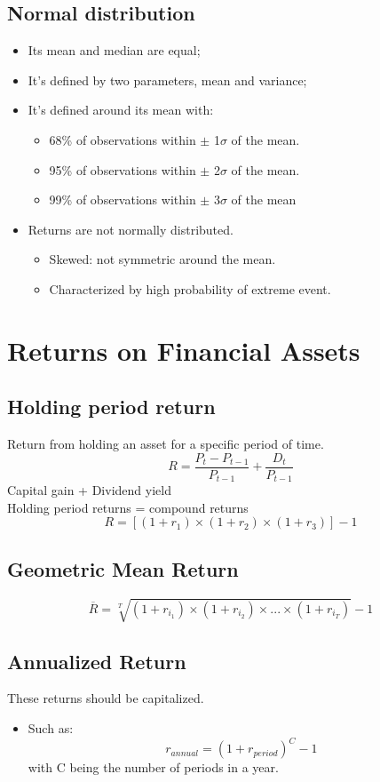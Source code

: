\documentclass[11pt,a4paper]{report}
\begin{document}
\subsection{Normal distribution}
\begin{itemize}
    \item Its mean and median are equal;
    \item It's defined by two parameters, mean and variance;
    \item It's defined around its mean with:
    \begin{itemize}
        \item 68\% of observations within $\pm$ 1$\sigma$ of the mean.
        \item 95\% of observations within $\pm$ 2$\sigma$ of the mean.
        \item 99\% of observations within $\pm$ 3$\sigma$ of the mean
    \end{itemize}
    \item Returns are not normally distributed.
    \begin{itemize}
        \item Skewed: not symmetric around the mean.
        \item Characterized by high probability of extreme event.
    \end{itemize}
\end{itemize}

\section{Returns on Financial Assets}
\subsection{Holding period return} Return from holding an asset for a specific period of time.
\[R = \frac{P_t - P_{t-1}}{P_{t-1}} + \frac{D_t}{P_{t-1}}\]
Capital gain + Dividend yield \\
Holding period returns = compound returns
\[R = [(1 + r_1) \times (1 + r_2) \times (1+r_3)] - 1 \]

\subsection{Geometric Mean Return}
\[\overline{R} = \sqrt[T]{(1+r_{i_1}) \times (1+r_{i_2}) \times ... \times (1+r_{i_T})} - 1\]
\subsection{Annualized Return} These returns should be capitalized.
\begin{itemize}
    \item Such as:
    \[ r_{annual} = (1+r_{period})^C - 1\] with C being the number of periods in a year.
\end{itemize}
\end{document}
